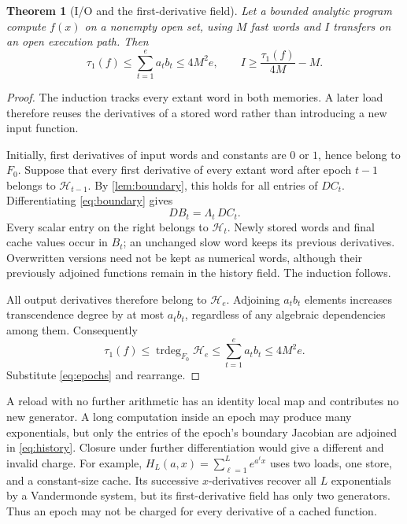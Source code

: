 \documentclass[11pt]{article}
\newtheorem{theorem}{Theorem}[section]
\theoremstyle{definition}
\theoremstyle{remark}
\newcommand{\cH}{\mathcal H}
\newcommand{\trdeg}{\operatorname{trdeg}}
\begin{document}
\begin{theorem}[I/O and the first-derivative field]
\label{thm:history}
Let a bounded analytic program compute $f(x)$ on a nonempty open set,
using $M$ fast words and $I$ transfers on an open execution path. Then
\begin{equation}
 \tau_1(f)\le\sum_{t=1}^e a_tb_t\le4M^2e,
 \qquad
 I\ge\frac{\tau_1(f)}{4M}-M.
 \label{eq:history-bound}
\end{equation}
\end{theorem}
\begin{proof}
The induction tracks every extant word in both memories. A later
load therefore reuses the derivatives of a stored word rather than
introducing a new input function.

Initially, first derivatives of input words and constants are $0$ or
$1$, hence belong to $F_0$. Suppose that every first derivative of
every extant word after epoch $t-1$ belongs to $\cH_{t-1}$. By
\cref{lem:boundary}, this holds for all entries of $DC_t$. Differentiating
\cref{eq:boundary} gives
\begin{equation}
 DB_t=\Lambda_t\,DC_t.
 \label{eq:chain}
\end{equation}
Every scalar entry on the right belongs to $\cH_t$. Newly stored words
and final cache values occur in $B_t$; an unchanged slow word keeps
its previous derivatives. Overwritten versions need not be kept
as numerical words, although their previously adjoined functions
remain in the history field. The induction follows.

All output derivatives therefore belong to $\cH_e$. Adjoining $a_tb_t$
elements increases transcendence degree by at most $a_tb_t$, regardless
of any algebraic dependencies among them. Consequently
\[
 \tau_1(f)\le\trdeg_{F_0}\cH_e
 \le\sum_{t=1}^e a_tb_t\le4M^2e.
\]
Substitute \cref{eq:epochs} and rearrange.
\end{proof}

A reload with no further arithmetic has an identity local map and contributes
no new generator. A long computation inside an epoch may produce many
exponentials, but only the entries of the epoch's boundary Jacobian
are adjoined in \cref{eq:history}. Closure under further differentiation would give a different and
invalid charge. For example, $H_L(a,x)=\sum_{\ell=1}^L e^{a^\ell x}$
uses two loads, one store, and a constant-size cache. Its successive
$x$-derivatives recover all $L$ exponentials by a Vandermonde system,
but its first-derivative field has only two generators. Thus an epoch
may not be charged for every derivative of a cached function.
\end{document}
